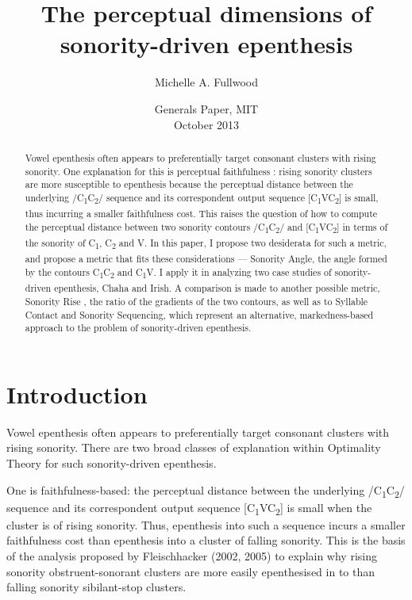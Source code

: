 \documentclass[12pt]{article}
\title{The perceptual dimensions of \\ sonority-driven epenthesis}
\author{Michelle A. Fullwood}
\date{Generals Paper, MIT \\ October 2013}
\begin{document}
\maketitle

\begin{abstract}
 
Vowel epenthesis often appears to preferentially target consonant clusters with rising sonority.
One explanation for this is perceptual faithfulness \citep{fleischhacker.2002,steriade.2006}: rising sonority clusters are more susceptible to epenthesis because the perceptual distance between the underlying /C\textsubscript{1}C\textsubscript{2}/ sequence and its correspondent output sequence [C\textsubscript{1}VC\textsubscript{2}] is small, thus incurring a smaller faithfulness cost.
This raises the question of how to compute the perceptual distance between two sonority contours /C\textsubscript{1}C\textsubscript{2}/ and [C\textsubscript{1}VC\textsubscript{2}] in terms of the sonority of C\textsubscript{1}, C\textsubscript{2} and V.  
In this paper, I propose two desiderata for such a metric, and propose a metric that fits these considerations --- {\sc Sonority Angle}, the angle formed by the contours C\textsubscript{1}C\textsubscript{2} and C\textsubscript{1}V. I apply it in analyzing two case studies of sonority-driven epenthesis, Chaha and Irish.  A comparison is made to another possible metric,
{\sc Sonority Rise} \citep{flemming.2008}, the ratio of the gradients of the two contours, as well as to Syllable Contact and Sonority Sequencing, which represent an alternative, markedness-based approach to the problem of sonority-driven epenthesis. 
\end{abstract}

\newpage
\tableofcontents
\newpage

\section{Introduction}

Vowel epenthesis often appears to preferentially target consonant clusters with rising sonority.
There are two broad classes of explanation within Optimality Theory for such sonority-driven epenthesis.

One is faithfulness-based: the perceptual distance between the underlying /C\textsubscript{1}C\textsubscript{2}/ sequence and its correspondent
output sequence [C\textsubscript{1}VC\textsubscript{2}] is small when the cluster is of rising sonority.
Thus, epenthesis into such a sequence incurs a smaller faithfulness cost than epenthesis into a cluster of falling sonority. This is the basis of the analysis proposed by Fleischhacker (2002, 2005) to explain why rising sonority obstruent-sonorant clusters are more easily epenthesised in
to than falling sonority sibilant-stop clusters.
\end{document}
